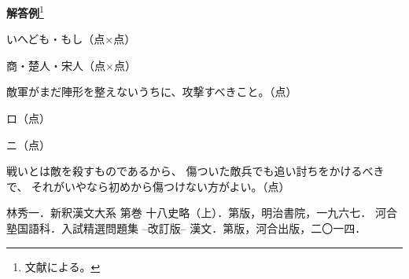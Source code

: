 \documentclass[a4j,landscape,twocolumn]{tarticle}
\newcommand{\midashi}[1]{\noindent \textbf{#1}}
\begin{document}
\vspace{3\baselineskip}
\midashi{解答例}\footnote{文献\cite{kawaikanbun}による。}\par
\renewcommand{\arraystretch}{1}
{\footnotesize
\noindent{}\quad いへども・もし（点$\times$\quad{}点）\par
\noindent{}\quad 商・楚人・宋人（点$\times$\quad{}点）\par
\noindent{}\quad 敵軍がまだ陣形を整えないうちに、攻撃すべきこと。（点）\par
\noindent{}\quad ロ（点）\par
\noindent{}\quad ニ（点）\par
\noindent{}\quad 戦いとは敵を殺すものであるから、
傷ついた敵兵でも追い討ちをかけるべきで、
それがいやなら初めから傷つけない方がよい。（点）\par
}



\vfill

\begin{thebibliography}{9}
林秀一．新釈漢文大系 第巻 十八史略（上）．第版，明治書院，一九六七．
河合塾国語科．入試精選問題集 --改訂版-- 漢文．第版，河合出版，二〇一四．
\end{thebibliography}
\end{document}
